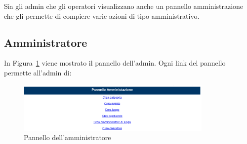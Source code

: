 \documentclass[10pt, a4paper]{article}
\begin{document}
Sia gli admin che gli operatori visualizzano anche un pannello amministrazione che gli permette di compiere varie azioni di tipo amministrativo.

\subsection{Amministratore}
In Figura~\ref{fig:pannello_admin} viene mostrato il pannello dell'admin. Ogni link del pannello
permette all'admin di:
\begin{figure}[h!]
	\centering
	\includegraphics[width=0.85\textwidth]{Images/pannello_admin.png}
	\caption{Pannello dell'amministratore}
	\label{fig:pannello_admin}
\end{figure}
\end{document}
